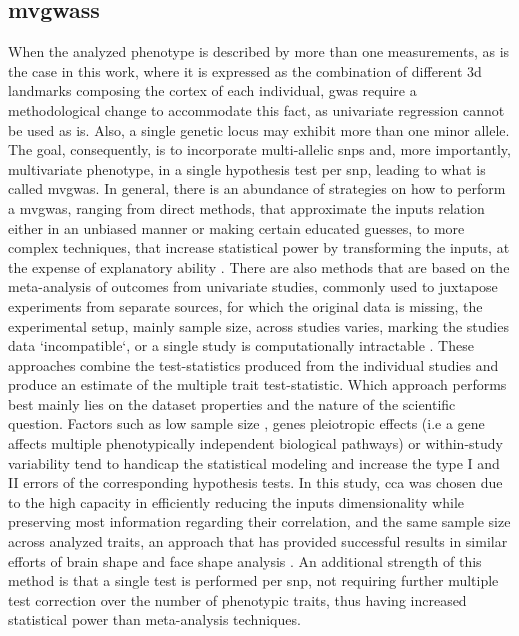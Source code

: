 \subsection{\Acfp{mvgwas}}
When the analyzed phenotype is described by more than one measurements, as is the case in this work, where it is expressed as the combination of different \ac{3d} landmarks composing the cortex of each individual, \ac{gwas} require a methodological change to accommodate this fact, as univariate regression cannot be used as is. Also, a single genetic locus may exhibit more than one minor allele. The goal, consequently, is to incorporate multi-allelic \acsp{snp} and, more importantly, multivariate phenotype, in a single hypothesis test per \ac{snp}, leading to what is called \acf{mvgwas}. In general, there is an abundance of strategies on how to perform a \ac{mvgwas}, ranging from direct methods, that approximate the inputs relation either in an unbiased manner or making certain educated guesses, to more complex techniques, that increase statistical power by transforming the inputs, at the expense of explanatory ability \cite{Galesloot2014}. There are also methods that are based on the meta-analysis of outcomes from univariate studies, commonly used to juxtapose experiments from separate sources, for which the original data is missing, the experimental setup, mainly sample size, across studies varies, marking the studies data `incompatible`, or a single study is computationally intractable \cite{Uffelmann2021,Cichonska2016}. These approaches combine the test-statistics produced from the individual studies and produce an estimate of the multiple trait test-statistic. Which approach performs best mainly lies on the dataset properties and the nature of the scientific question. Factors such as low sample size \cite{Sheng2021}, genes pleiotropic effects \cite{Fernandes2021} (i.e a gene affects multiple phenotypically independent biological pathways) or within-study variability \cite{Usui2021,Jackson2011} tend to handicap the statistical modeling and increase the type I and II errors of the corresponding hypothesis tests. In this study, \ac{cca} was chosen due to the high capacity in efficiently reducing the inputs dimensionality while preserving most information regarding their correlation, and the same sample size across analyzed traits, an approach that has provided successful results in similar efforts of brain shape and face shape analysis \cite{Claes2018,Naqvi2021}. An additional strength of this method is that a single test is performed per \ac{snp}, not requiring further multiple test correction over the number of phenotypic traits, thus having increased statistical power than meta-analysis techniques.

